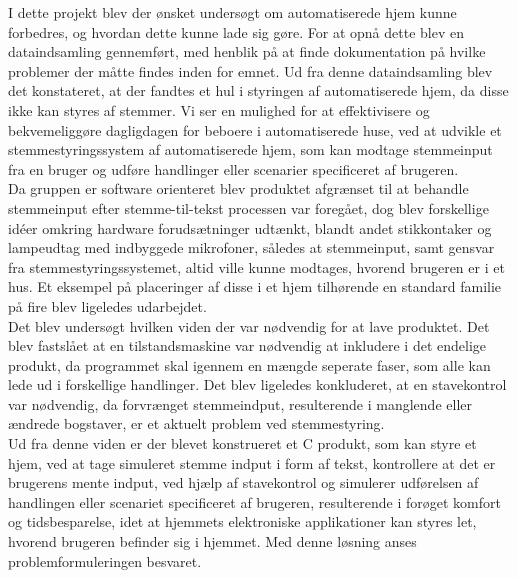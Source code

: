 I dette projekt blev der ønsket undersøgt om automatiserede hjem kunne forbedres, og hvordan dette kunne lade sig gøre. For at opnå dette blev en dataindsamling gennemført, med henblik på at finde dokumentation på hvilke problemer der måtte findes inden for emnet. Ud fra denne dataindsamling blev det konstateret, at der fandtes et hul i styringen af automatiserede hjem, da disse ikke kan styres af stemmer. Vi ser en mulighed for at effektivisere og bekvemeliggøre dagligdagen for beboere i automatiserede huse, ved at udvikle et stemmestyringssystem af automatiserede hjem, som kan modtage stemmeinput fra en bruger og udføre handlinger eller scenarier specificeret af brugeren.\\
Da gruppen er software orienteret blev produktet afgrænset til at behandle stemmeinput efter stemme-til-tekst processen var foregået, dog blev forskellige idéer omkring hardware forudsætninger udtænkt, blandt andet stikkontaker og lampeudtag med indbyggede mikrofoner, således at stemmeinput, samt gensvar fra stemmestyringssystemet, altid ville kunne modtages, hvorend brugeren er i et hus. Et eksempel på placeringer af disse i et hjem tilhørende en standard familie på fire blev ligeledes udarbejdet.\\
Det blev undersøgt hvilken viden der var nødvendig for at lave produktet. Det blev fastslået at en tilstandsmaskine var nødvendig at inkludere i det endelige produkt, da programmet skal igennem en mængde seperate faser, som alle kan lede ud i forskellige handlinger. Det blev ligeledes konkluderet, at en stavekontrol var nødvendig, da forvrænget stemmeindput, resulterende i manglende eller ændrede bogstaver, er et aktuelt problem ved stemmestyring.\\
Ud fra denne viden er der blevet konstrueret et C produkt, som kan styre et hjem, ved at tage simuleret stemme indput i form af tekst, kontrollere at det er brugerens mente indput, ved hjælp af stavekontrol og simulerer udførelsen af handlingen eller scenariet specificeret af brugeren, resulterende i forøget komfort og tidsbesparelse, idet at hjemmets elektroniske applikationer kan styres let, hvorend brugeren befinder sig i hjemmet. Med denne løsning anses problemformuleringen besvaret.